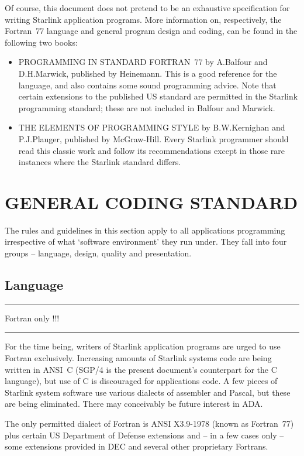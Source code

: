 \documentclass[twoside,11pt]{article}
\newcounter{sruleno}
\newcommand{\srule}[1]{
    \addtocounter{sruleno}{1}
    \goodbreak
    \rule[0.5ex]{\textwidth}{0.3mm}
    {\Large #1 \hfill {\thesruleno}}
    \rule[0.5ex]{\textwidth}{0.1mm}
}
\newcommand{\srule}[1]{
       \addtocounter{sruleno}{1}
       \begin{rawhtml} <HR> \end{rawhtml}
       {\Large \thesruleno}~~~~{\Large #1}
       \begin{rawhtml} <HR> \end{rawhtml}
       \end{tabular}
  }
\renewcommand{\_}{{\tt\char'137}}
\begin{document}
Of course, this document does not pretend to be an exhaustive specification for
writing Starlink application programs.
More information on, respectively, the Fortran~77 language and general program
design and coding, can be found in the following two books:
\begin{itemize}
\item PROGRAMMING IN STANDARD FORTRAN~77 by A.Balfour and D.H.Marwick,
published by Heinemann.
This is a good reference for the language, and also contains some sound
programming advice.
Note that certain extensions to the published US standard are permitted in the
Starlink programming standard; these are not included in Balfour and Marwick.
\item THE ELEMENTS OF PROGRAMMING STYLE by B.W.Kernighan and P.J.Plauger,
published by McGraw-Hill.
Every Starlink programmer should read this classic
work and follow its recommendations
except in those rare instances where the Starlink standard differs.
\end{itemize}

\newpage
\section{GENERAL CODING STANDARD}

The rules and guidelines in this section apply to all applications programming
irrespective of what `software environment' they run under.
They fall into four groups -- language, design, quality and
presentation.

\goodbreak
\subsection{Language}

\srule{Fortran only !!!}
For the time being, writers of Starlink application programs are
urged to use Fortran exclusively.  Increasing amounts of Starlink
systems code are being written in ANSI~C (SGP/4 is the present document's
counterpart for the C language), but use of C is discouraged for
applications code.  A few pieces of Starlink system software use
various dialects of assembler and Pascal, but these are being
eliminated.  There may conceivably be future interest in ADA.

The only permitted dialect of Fortran
is ANSI X3.9-1978 (known as Fortran~77) plus certain
US Department of Defense extensions and -- in a few cases only -- some
extensions provided in DEC and several other proprietary Fortrans.
\end{document}
